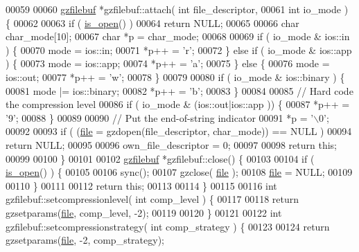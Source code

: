 \begin{DoxyCode}
00059 
00060 \hyperlink{classgzfilebuf}{gzfilebuf} *gzfilebuf::attach( \textcolor{keywordtype}{int} file\_descriptor,
00061                               \textcolor{keywordtype}{int} io\_mode ) \{
00062 
00063   \textcolor{keywordflow}{if} ( \hyperlink{classgzofstream_acb1c9c6dccaf41bc5e44c2263ea48de3}{is\_open}() )
00064     \textcolor{keywordflow}{return} NULL;
00065 
00066   \textcolor{keywordtype}{char} char\_mode[10];
00067   \textcolor{keywordtype}{char} *p = char\_mode;
00068 
00069   \textcolor{keywordflow}{if} ( io\_mode & ios::in ) \{
00070     mode = ios::in;
00071     *p++ = \textcolor{charliteral}{'r'};
00072   \} \textcolor{keywordflow}{else} \textcolor{keywordflow}{if} ( io\_mode & ios::app ) \{
00073     mode = ios::app;
00074     *p++ = \textcolor{charliteral}{'a'};
00075   \} \textcolor{keywordflow}{else} \{
00076     mode = ios::out;
00077     *p++ = \textcolor{charliteral}{'w'};
00078   \}
00079 
00080   \textcolor{keywordflow}{if} ( io\_mode & ios::binary ) \{
00081     mode |= ios::binary;
00082     *p++ = \textcolor{charliteral}{'b'};
00083   \}
00084 
00085   \textcolor{comment}{// Hard code the compression level}
00086   \textcolor{keywordflow}{if} ( io\_mode & (ios::out|ios::app )) \{
00087     *p++ = \textcolor{charliteral}{'9'};
00088   \}
00089 
00090   \textcolor{comment}{// Put the end-of-string indicator}
00091   *p = \textcolor{charliteral}{'\(\backslash\)0'};
00092 
00093   \textcolor{keywordflow}{if} ( (\hyperlink{structfile}{file} = gzdopen(file\_descriptor, char\_mode)) == NULL )
00094     \textcolor{keywordflow}{return} NULL;
00095 
00096   own\_file\_descriptor = 0;
00097 
00098   \textcolor{keywordflow}{return} \textcolor{keyword}{this};
00099 
00100 \}
00101 
00102 \hyperlink{classgzfilebuf}{gzfilebuf} *gzfilebuf::close() \{
00103 
00104   \textcolor{keywordflow}{if} ( \hyperlink{classgzofstream_acb1c9c6dccaf41bc5e44c2263ea48de3}{is\_open}() ) \{
00105 
00106     sync();
00107     gzclose( \hyperlink{structfile}{file} );
00108     \hyperlink{structfile}{file} = NULL;
00109 
00110   \}
00111 
00112   \textcolor{keywordflow}{return} \textcolor{keyword}{this};
00113 
00114 \}
00115 
00116 \textcolor{keywordtype}{int} gzfilebuf::setcompressionlevel( \textcolor{keywordtype}{int} comp\_level ) \{
00117 
00118   \textcolor{keywordflow}{return} gzsetparams(\hyperlink{structfile}{file}, comp\_level, -2);
00119 
00120 \}
00121 
00122 \textcolor{keywordtype}{int} gzfilebuf::setcompressionstrategy( \textcolor{keywordtype}{int} comp\_strategy ) \{
00123 
00124   \textcolor{keywordflow}{return} gzsetparams(\hyperlink{structfile}{file}, -2, comp\_strategy);

\end{DoxyCode}
